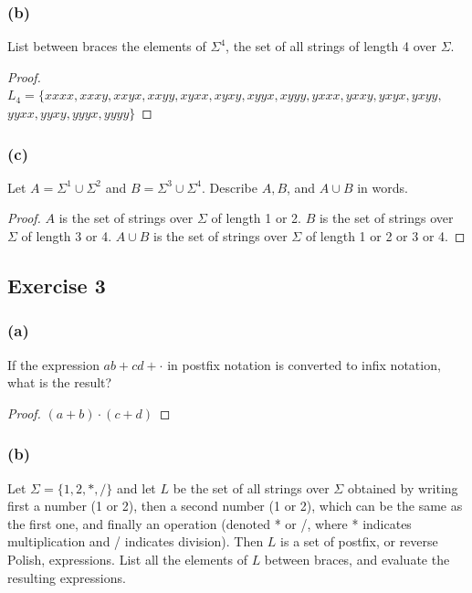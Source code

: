 \documentclass[14pt]{extarticle}
\begin{document}
\subsubsection{(b)}
List between braces the elements of \(\Sigma^4\), the set of all strings of length 4 over \(\Sigma\).

\begin{proof}
    \(L_4 = \{xxxx, xxxy, xxyx, xxyy, xyxx, xyxy, xyyx, xyyy, yxxx, yxxy, yxyx, yxyy,\) \\
    \(yyxx, yyxy, yyyx, yyyy\}\)
\end{proof}

\subsubsection{(c)}
Let \(A = \Sigma^1 \cup \Sigma^2\) and \(B = \Sigma^3 \cup \Sigma^4\). Describe \(A, B\), and \(A \cup B\) in words.

\begin{proof}
    \(A\) is the set of strings over \(\Sigma\) of length 1 or 2.
    \(B\) is the set of strings over \(\Sigma\) of length 3 or 4.
    \(A \cup B\) is the set of strings over \(\Sigma\) of length 1 or 2 or 3 or 4.
\end{proof}

\subsection{Exercise 3}
\subsubsection{(a)}
If the expression \(ab + cd + \cdot\) in postfix notation is converted to infix notation, what is the result?

\begin{proof}
    \((a + b)\cdot(c + d)\)
\end{proof}

\subsubsection{(b)}
Let \(\Sigma = \{1, 2, *, /\}\) and let \(L\) be the set of all strings over \(\Sigma\) obtained by writing first a number
(1 or 2), then a second number (1 or 2), which can be the same as the first one, and finally an operation (denoted * or /,
where * indicates multiplication and / indicates division). Then \(L\) is a set of postfix, or reverse Polish,
expressions. List all the elements of \(L\) between braces, and evaluate the resulting expressions.
\end{document}
